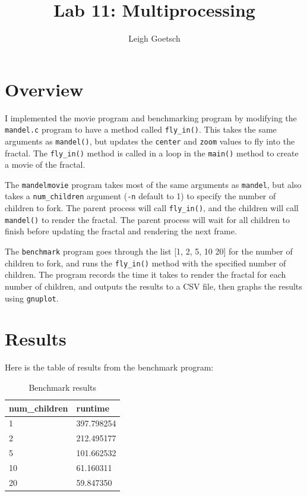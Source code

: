 \documentclass{assignment}
\author{Leigh Goetsch}
\title{Lab 11: Multiprocessing}
\begin{document}
\maketitle

\newpage


\section{Overview}

I implemented the movie program and benchmarking program by modifying the \verb|mandel.c| program to have a method called \verb|fly_in()|. This takes the same arguments as \verb|mandel()|, but updates the \verb|center| and \verb|zoom| values to fly into the fractal. The \verb|fly_in()| method is called in a loop in the \verb|main()| method to create a movie of the fractal.

The \verb|mandelmovie| program takes most of the same arguments as \verb|mandel|, but also takes a \verb|num_children| argument (\verb|-n| default to 1) to specify the number of children to fork. The parent process will call \verb|fly_in()|, and the children will call \verb|mandel()| to render the fractal. The parent process will wait for all children to finish before updating the fractal and rendering the next frame.

The \verb|benchmark| program goes through the list [1, 2, 5, 10 20] for the number of children to fork, and runs the \verb|fly_in()| method with the specified number of children. The program records the time it takes to render the fractal for each number of children, and outputs the results to a CSV file, then graphs the results using \verb|gnuplot|.

\section{Results}

Here is the table of results from the benchmark program:
\begin{table}
    \centering
    \begin{tabular}{ll}
	\toprule
	num\_children & runtime \\
	\midrule
	1 & 397.798254 \\
	2 & 212.495177 \\
	5 & 101.662532 \\
	10 & 61.160311 \\
	20 & 59.847350 \\
	\bottomrule
    \end{tabular}
    \caption{Benchmark results}
\end{table}
\end{document}
